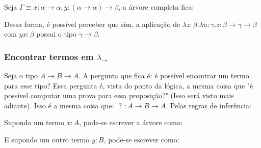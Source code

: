 \documentclass[../main.tex]{subfiles}
\begin{document}
Seja $\Gamma \equiv x : \alpha \to \alpha, y : (\alpha \to \alpha) \to \beta$, a árvore completa fica:


\begin{prooftree}
    

\end{prooftree}

Dessa forma, é possível perceber que sim, a aplicação de $\lambda z : \beta . \lambda u : \gamma . z : \beta \to \gamma \to \beta$ com $yx : \beta$ possui o tipo $\gamma \to \beta$. 


\subsubsection[Encontrar termos no STLC]{Encontrar termos em $\lambda_\to$}

Seja o tipo $A \to B \to A$. A pergunta que fica é: é possível encontrar um termo para esse tipo? Essa pergunta é, vista do ponto da lógica, a mesma coisa que "é possível computar uma prova para essa proposição?" (Isso será visto mais adiante). Isso é a mesma coisa que: $\text{ ? } : A \to B \to A$. Pelas regras de inferência:

\begin{prooftree}
\end{prooftree}

Supondo um termo $x : A$, pode-se escrever a árvore como:

\begin{prooftree}
\end{prooftree}

E supondo um outro termo $y : B$, pode-se escrever como:
\end{document}
